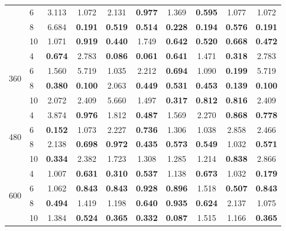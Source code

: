 \begin{table}[htbp]
\begin{tabular}{llcccccccc}
 & 6 & 3.113 & 1.072 & 2.131 & \bfseries 0.977 & 1.369 & \bfseries 0.595 & 1.077 & 1.072 \\
 & 8 & 6.684 & \bfseries 0.191 & \bfseries 0.519 & \bfseries 0.514 & \bfseries 0.228 & \bfseries 0.194 & \bfseries 0.576 & \bfseries 0.191 \\
 & 10 & 1.071 & \bfseries 0.919 & \bfseries 0.440 & 1.749 & \bfseries 0.642 & \bfseries 0.520 & \bfseries 0.668 & \bfseries 0.472 \\
\multirow[t]{4}{*}{360} & 4 & \bfseries 0.674 & 2.783 & \bfseries 0.086 & \bfseries 0.061 & \bfseries 0.641 & 1.471 & \bfseries 0.318 & 2.783 \\
 & 6 & 1.560 & 5.719 & 1.035 & 2.212 & \bfseries 0.694 & 1.090 & \bfseries 0.199 & 5.719 \\
 & 8 & \bfseries 0.380 & \bfseries 0.100 & 2.063 & \bfseries 0.449 & \bfseries 0.531 & \bfseries 0.453 & \bfseries 0.139 & \bfseries 0.100 \\
 & 10 & 2.072 & 2.409 & 5.660 & 1.497 & \bfseries 0.317 & \bfseries 0.812 & \bfseries 0.816 & 2.409 \\
\multirow[t]{4}{*}{480} & 4 & 3.874 & \bfseries 0.976 & 1.812 & \bfseries 0.487 & 1.569 & 2.270 & \bfseries 0.868 & \bfseries 0.778 \\
 & 6 & \bfseries 0.152 & 1.073 & 2.227 & \bfseries 0.736 & 1.306 & 1.038 & 2.858 & 2.466 \\
 & 8 & 2.138 & \bfseries 0.698 & \bfseries 0.972 & \bfseries 0.435 & \bfseries 0.573 & \bfseries 0.549 & 1.032 & \bfseries 0.571 \\
 & 10 & \bfseries 0.334 & 2.382 & 1.723 & 1.308 & 1.285 & 1.214 & \bfseries 0.838 & 2.866 \\
\multirow[t]{4}{*}{600} & 4 & 1.007 & \bfseries 0.631 & \bfseries 0.310 & \bfseries 0.537 & 1.138 & \bfseries 0.673 & 1.032 & \bfseries 0.179 \\
 & 6 & 1.062 & \bfseries 0.843 & \bfseries 0.843 & \bfseries 0.928 & \bfseries 0.896 & 1.518 & \bfseries 0.507 & \bfseries 0.843 \\
 & 8 & \bfseries 0.494 & 1.419 & 1.198 & \bfseries 0.640 & \bfseries 0.935 & \bfseries 0.624 & 2.137 & 1.075 \\
 & 10 & 1.384 & \bfseries 0.524 & \bfseries 0.365 & \bfseries 0.332 & \bfseries 0.087 & 1.515 & 1.166 & \bfseries 0.365 \\
\bottomrule
\end{tabular}
\end{table}
